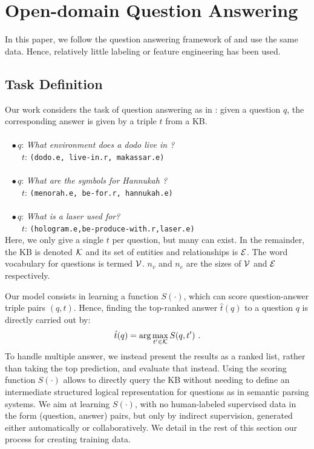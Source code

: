 \documentclass[runningheads,a4paper]{llncs}
\newcommand{\kb}[1]{{\small\texttt{#1}}\xspace}
\newcommand{\ab}[1]{{\color{black}{#1}}}
\begin{document}
\section{Open-domain Question Answering}
\label{sec:qa}

In this paper, we follow the question answering framework of \cite{paralex} and use the same data. Hence, relatively little labeling or feature engineering has been used.



\subsection{Task Definition}

Our work considers the task of question answering as in \cite{paralex}: given a question $q$, the corresponding answer is given by a triple $t$ from a KB.
\ab{This means that we consider questions for which a set of triples $t$ provide an interpretation of the question and its answer, such as:}\\
~\\
$\mbox{~~}\bullet\mbox{}q$: {\it What environment does a dodo live in ?}\\
$\mbox{~~~~~~}t$: \kb{(dodo.e, live-in.r, makassar.e)}\\
~\\
$\mbox{~~}\bullet\mbox{}q$: {\it What are the symbols for Hannukah ?}\\
$\mbox{~~~~~~}t$: \kb{(menorah.e, be-for.r, hannukah.e)}\\
~\\
$\mbox{~~}\bullet\mbox{}q$: {\it What is a laser used for?}\\
$\mbox{~~~~~~}t$: \kb{(hologram.e,be-produce-with.r,laser.e)}\\

Here, we only give a single $t$ per question, but many can exist.
In the remainder, the KB is denoted ${\cal K}$ and its set of entities and relationships is ${\cal E}$.
The word vocabulary for questions is termed ${\cal V}$.
$n_v$ and $n_e$ are the sizes of ${\cal V}$ and ${\cal E}$ respectively. 

Our model consists in learning a function $S(\cdot)$, which can score question-answer triple pairs $(q,t)$. Hence, finding the top-ranked answer $\hat{t}(q)$ to  a question $q$ is directly carried out by:
\[
    \hat{t}(q)=\arg \max_{t'\in{\cal K}} S(q,t')~.
\]
To handle multiple answer, we instead present the results as a ranked list, rather than taking the top prediction, and evaluate that instead. 
Using the scoring function $S(\cdot)$ allows to directly query the KB without needing to define an intermediate structured logical representation for questions as in semantic parsing systems. 
We aim at learning $S(\cdot)$, with no human-labeled supervised 
data in the form (question, answer) pairs,
but only by indirect supervision,
generated either automatically or collaboratively. 
We detail in the rest of this section our process for creating training data.
\end{document}
